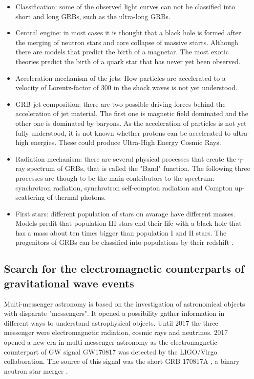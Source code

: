 \documentclass[12pt, a4paper,titlepage]{article}
\numberwithin{equation}{section}
\numberwithin{figure}{section}
\begin{document}
\begin{itemize}
\item{Classification: some of the observed light curves can not be classified into short and long GRBs, such as the ultra-long GRBs.}
\item{Central engine: in most cases it is thought that a black hole is formed after the merging of neutron stars and core collapse of massive starts. Although there are models that predict the birth of a magnetar. The most exotic theories predict the birth of a quark star that has never yet been observed.}
\item{Acceleration mechanism of the jets: How particles are accelerated to a velocity of Lorentz-factor of 300 in the shock waves is not yet understood.}
\item{GRB jet composition: there are two possible driving forces behind the acceleration of jet material. The first one is magnetic field dominated and the other one is dominated by baryons. As the acceleration of particles is not yet fully understood, it is not known whether protons can be accelerated to ultra-high energies. These could produce Ultra-High Energy Cosmic Rays.} 
\item{Radiation mechanism: there are several physical processes that create the $\gamma$-ray spectrum of GRBs, that is called  the "Band" function. The following three processes are though to be the main contributors to the spectrum: synchrotron radiation, synchrotron self-compton radiation and Compton up-scattering of thermal photons.}
\item{First stars: different population of stars on avarage have different masses. Models predit that population III stars end their life with a black hole that has a mass about ten times bigger than population I and II stars. The progenitors of GRBs can be classified into populations by their redshift \cite{grb20}.}

\end{itemize}

\subsection{Search for the electromagnetic counterparts of gravitational wave events}

Multi-messenger astronomy is based on the investigation of astronomical objects with disparate "messengers". It opened a possibility gather information in different ways to understand astrophysical objects. Until 2017 the three messenger were electromagnetic radiation, cosmic rays and neutrinos. 2017 opened a new era in multi-messenger astronomy as the electromagnetic counterpart of GW signal GW170817 was detected by the LIGO/Virgo collaboration. The source of this signal was the short GRB 170817A \cite{grb21}, a binary neutron star merger \cite{grb17}. 
\end{document}
